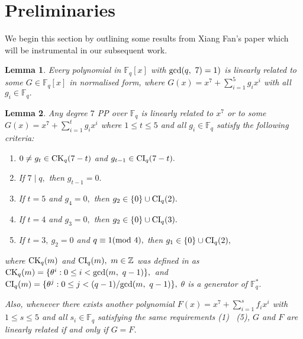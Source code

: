 \documentclass[12pt,a4wide, reqno]{amsart}
\newtheorem{lemma}{Lemma}
\theoremstyle{definition}
\theoremstyle{remark}
\numberwithin{equation}{section}
\begin{document}
\section{Preliminaries}
We begin this section by outlining some results from Xiang Fan's paper \cite{xfan} which will be instrumental in our subsequent work.
\begin{lemma}\cite[Proposition~7]{xfan}\label{l2}
    Every polynomial in $\mathbb{F}_q[x]$ with $\textup{gcd}(q,~7)=1)$ is linearly related to some $G\in\mathbb{F}_q[x]$ in normalised form, where $G(x)=x^7+\sum_{i=1}^{5}g_ix^i$ with all $g_i\in \mathbb{F}_q.$ 
\end{lemma}
\begin{lemma}\cite[Proposition~11]{xfan}\label{l3}
    Any degree $7$ PP over $\mathbb{F}_q$ is linearly related to $x^7$ or to some $G(x)=x^7+\sum_{i=1}^{t}g_ix^i$ where $1\leq t \leq 5$ and all $g_i\in \mathbb{F}_q$ satisfy the following criteria:
    \begin{enumerate}[label=\textup{(\arabic*)}]
        \item 
        $0\neq g_t\in \textup{CK}_q(7-t)$ and $g_{t-1}\in \textup{CI}_q(7-t).$
        \item 
        If $7\mid q,$ then $g_{t-1}=0.$
        \item 
        If $t=5$ and $g_4=0,$ then $g_2\in \{0\}\cup \textup{CI}_q(2).$ 
        \item 
        If $t=4$ and $g_3=0,$ then $g_2\in \{0\}\cup \textup{CI}_q(3).$
        \item 
        If $t=3,~g_2=0$ and $q\equiv 1 (\textup{mod}~4),$ then $g_1\in \{0\}\cup \textup{CI}_q(2),$
    \end{enumerate}
    where $\textup{CK}_q(m)$ and $\textup{CI}_q(m),~m\in\mathbb{Z}$ was defined in \cite{xfan} as\\
    \hspace*{3 cm} $\textup{CK}_q(m)=\{\theta^i: 0\leq i < \text{gcd}(m,~q-1)\},$~and\\
 \hspace*{3 cm} $\textup{CI}_q(m)=\{\theta^j: 0\leq j < (q-1)/\text{gcd}(m,~q-1)\},$ $\theta$ is a generator of $\mathbb{F}_q^*.$

 
    Also, whenever there exists another polynomial $F(x)=x^7+\sum_{i=1}^{s}f_i x^i$ with $1\leq s \leq 5$ and all $s_i\in \mathbb{F}_q$ satisfying the same requirements \emph{(1) \textendash\ (5)}, $G$ and $F$ are linearly related if and only if $G=F.$
\end{lemma}
\end{document}

